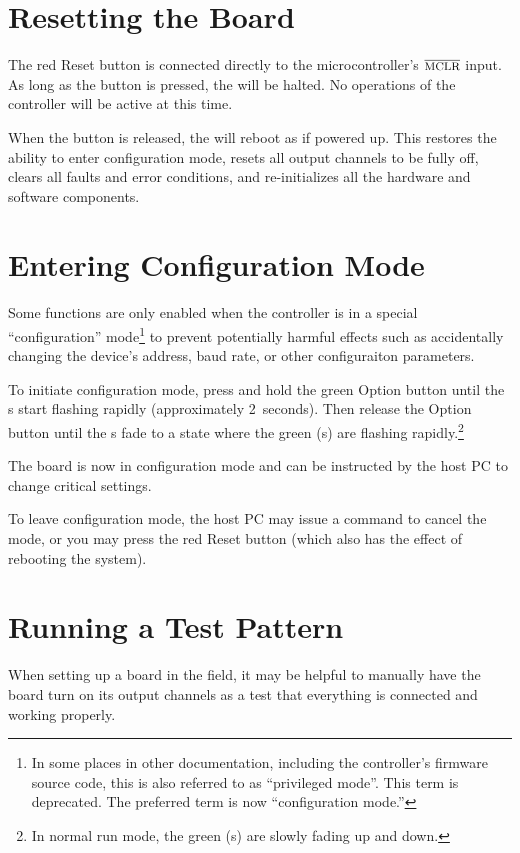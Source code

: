 \documentclass[letterpaper,twoside,onecolumn,openright,final]{memoir}
\begin{document}
\section{Resetting the Board}
The red Reset button is connected directly to the microcontroller's $\overline{\hbox{\mc{MCLR}}}$ input.
As long as the button is pressed, the  will be halted.  No operations of the controller
will be active at this time.  

When the button is released, the  will reboot as if powered up.  This restores the ability
to enter configuration mode, resets all output channels to be fully off, 
clears all faults and error conditions, and re-initializes all the hardware
and software components.

\section{Entering Configuration Mode}\label{sec:configmode}
Some functions are only enabled when the controller is in a special ``configuration'' mode\footnote{In
some places in other documentation, including the controller's firmware source code, this is also
referred to as ``privileged mode''.  This term is deprecated. The preferred term is now
``configuration mode.''} to prevent potentially harmful effects such as accidentally changing
the device's address, baud rate, or other configuraiton parameters.

To initiate configuration mode, press and hold the green Option button until the s start
flashing rapidly (approximately 2~seconds).  Then release the Option button until the s
fade to a state where the green (s) are flashing rapidly.\footnote{In normal run mode,
the green (s) are slowly fading up and down.}

The board is now in configuration mode and can be instructed by the host PC to change critical
settings.

To leave configuration mode, the host PC may issue a command to cancel the mode, or you may press
the red Reset button (which also has the effect of rebooting the system).

\section{Running a Test Pattern}
When setting up a board in the field, it may be helpful to manually have the board turn on its
output channels as a test that everything is connected and working properly.
\end{document}
